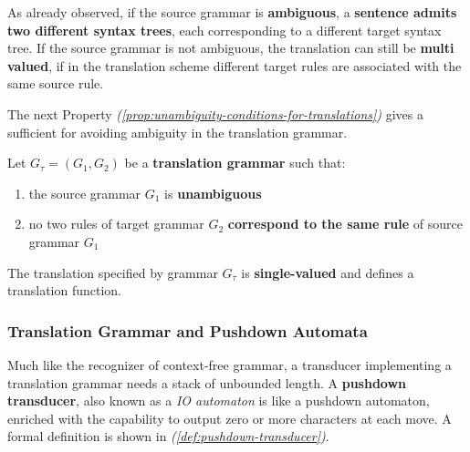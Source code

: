 \documentclass[english]{article}
\begin{document}
As already observed, if the source grammar is \textbf{ambiguous}, a \textbf{sentence admits two different syntax trees}, each corresponding to a different target syntax tree.
If the source grammar is not ambiguous, the translation can still be \textbf{multi valued}, if in the translation scheme different target rules are associated with the same source rule.

The next Property \textit{(\ref{prop:unambiguity-conditions-for-translations})} gives a sufficient for avoiding ambiguity in the translation grammar.

\begin{property}
  \label{prop:unambiguity-conditions-for-translations}
  Let \(G_\tau = \left( G_1, G_2 \right)\) be a \textbf{translation grammar} such that:

  \begin{enumerate}
    \item the source grammar \(G_1\) is \textbf{unambiguous}
    \item no two rules of target grammar \(G_2\) \textbf{correspond to the same rule} of source grammar \(G_1\)
  \end{enumerate}

  The translation specified by grammar \(G_\tau\) is \textbf{single-valued} and defines a translation function.
\end{property}

\subsubsection{Translation Grammar and Pushdown Automata}

Much like the recognizer of context-free grammar, a transducer implementing a translation grammar needs a stack of unbounded length.
A \textbf{pushdown transducer}, also known as a \textit{IO automaton} is like a pushdown automaton, enriched with the capability to output zero or more characters at each move.
A formal definition is shown in \textit{(\ref{def:pushdown-transducer})}.
\end{document}

